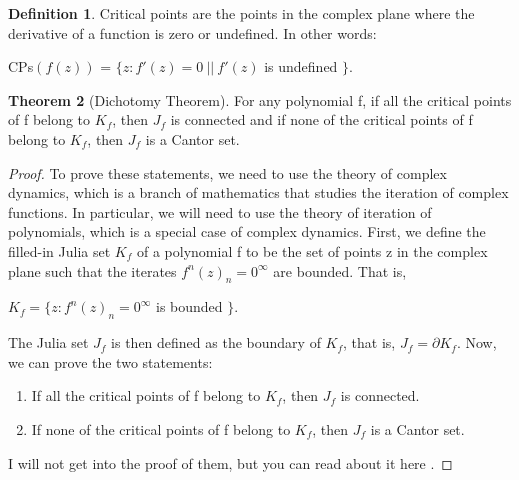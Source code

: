 \documentclass[a4paper,11pt]{article}
\theoremstyle{definition}
\newtheorem{defn}{Definition}[section] %
\newtheorem{theorem}[defn]{Theorem} %
\numberwithin{equation}{section} %
\begin{document}
\begin{defn}
    Critical points are the points in the complex plane where the derivative of a function is zero or undefined. In other words:
    \begin{center}
        CPs$( f(z) )$ = $\{ z : f'(z) = 0~||~f'(z) $ is undefined $ \}$.
    \end{center}
    
\end{defn}

\begin{theorem}[Dichotomy Theorem]
    For any polynomial f, if all the critical points of f belong to $K_f$, then $J_f$ is connected and if none of the critical points of f belong to $K_f$, then $J_f$ is a Cantor set.
\end{theorem}
\begin{proof}
    To prove these statements, we need to use the theory of complex dynamics, which is a branch of mathematics that studies the iteration of complex functions. In particular, we will need to use the theory of iteration of polynomials, which is a special case of complex dynamics.
    First, we define the filled-in Julia set $K_f$ of a polynomial f to be the set of points z in the complex plane such that the iterates ${f^n(z)}_n = 0^{\infty}$ are bounded. That is,
    \begin{center}
        $K_f = \{ z : {f^n(z)}_n = 0^{\infty} $ is bounded $ \}$.
    \end{center}
    The Julia set $J_f$ is then defined as the boundary of $K_f$, that is, $J_f = \partial K_f$.
    Now, we can prove the two statements:
    \begin{enumerate}
        \item If all the critical points of f belong to $K_f$, then $J_f$ is connected.
        \item If none of the critical points of f belong to $K_f$, then $J_f$ is a Cantor set.
    \end{enumerate}
    I will not get into the proof of them, but you can read about it here \cite{dichotomy}.

\end{proof}



\printbibliography
\end{document}
